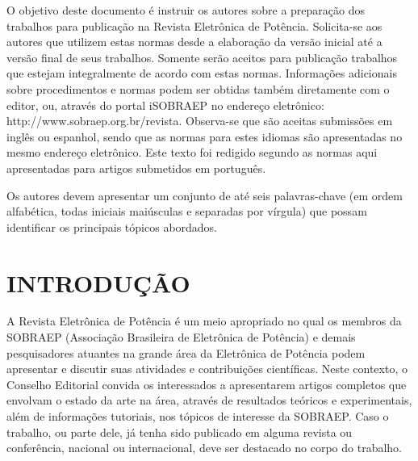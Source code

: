 




\maketitle

\begin{resumo}
	O objetivo deste documento é instruir os autores sobre a preparação dos trabalhos para publicação na Revista Eletrônica de Potência. Solicita-se aos autores que utilizem estas normas desde a elaboração da versão inicial até a versão final de seus trabalhos. Somente serão aceitos para publicação trabalhos que estejam integralmente de acordo com estas normas. Informações adicionais sobre procedimentos e normas podem ser obtidas também diretamente com o editor, ou, através do portal iSOBRAEP no endereço eletrônico: http://www.sobraep.org.br/revista. Observa-se que são aceitas submissões em inglês ou espanhol, sendo que as normas para estes idiomas são apresentadas no mesmo endereço eletrônico. Este texto foi redigido segundo as  normas aqui apresentadas para artigos submetidos em português.
\end{resumo}

\begin{palavraschave }
	Os autores devem apresentar um conjunto de até seis palavras-chave (em ordem alfabética, todas iniciais maiúsculas e separadas por vírgula) que possam identificar os principais tópicos abordados.
\end{palavraschave }


\section{INTRODUÇÃO}

A Revista Eletrônica de Potência é um meio apropriado no qual os membros da SOBRAEP (Associação Brasileira de Eletrônica de Potência) e demais pesquisadores atuantes na grande área da Eletrônica de Potência podem apresentar e discutir suas atividades e contribuições científicas. Neste contexto, o Conselho Editorial convida os interessados a apresentarem artigos completos que envolvam o estado da arte na área, através de resultados teóricos e experimentais, além de informações tutoriais, nos tópicos de interesse da SOBRAEP. Caso o trabalho, ou parte dele, já tenha sido publicado em alguma revista ou conferência, nacional ou internacional, deve ser destacado no corpo do trabalho.

